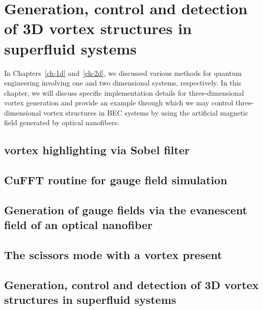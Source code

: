 \chapter{Generation, control and detection of 3D vortex structures in superfluid systems}
\label{ch-3d}

In Chapters~\ref{ch-1d} and~\ref{ch-2d}, we discussed various methods for quantum engineering involving one and two dimensional systems, respectively.
In this chapter, we will discuss specific implementation details for three-dimensional vortex generation and provide an example through which we may control three-dimensional vortex structures in BEC systems by using the artificial magnetic field generated by optical nanofibers.

\section{vortex highlighting via Sobel filter}

\section{CuFFT routine for gauge field simulation}

\section{Generation of gauge fields via the evanescent field of an optical nanofiber}

\section{The scissors mode with a vortex present}

\section{Generation, control and detection of 3D vortex structures in superfluid
 systems}
